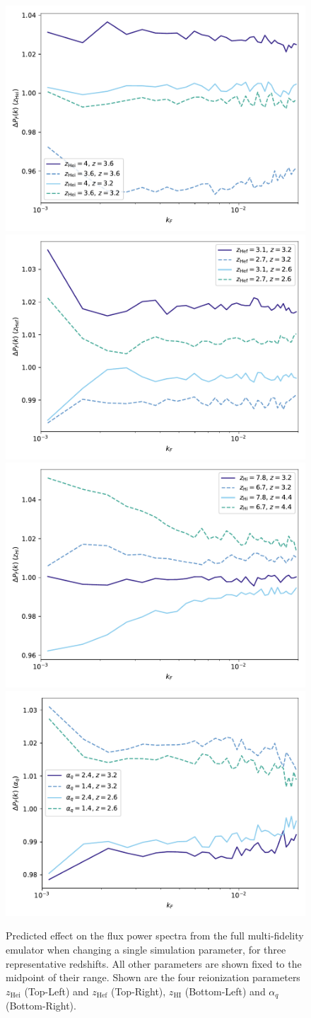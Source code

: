 \documentclass[a4paper,11pt]{article}
\begin{document}
\begin{figure}
    \centering
	\includegraphics[width=0.48\columnwidth]{figures/single_param_herei.pdf}
    \includegraphics[width=0.48\columnwidth]{figures/single_param_heref.pdf} \\
	\includegraphics[width=0.48\columnwidth]{figures/single_param_hireionz.pdf}
    \includegraphics[width=0.48\columnwidth]{figures/single_param_alphaq.pdf}
    \caption{Predicted effect on the flux power spectra from the full multi-fidelity emulator when changing a single simulation parameter, for three representative redshifts. All other parameters are shown fixed to the midpoint of their range. Shown are the four reionization parameters $z_\mathrm{Hei}$ (Top-Left) and $z_\mathrm{Hef}$ (Top-Right), $z_\mathrm{HI}$ (Bottom-Left) and $\alpha_q$ (Bottom-Right).}
    \label{fig:zhefluxpower}
\end{figure}
\end{document}
